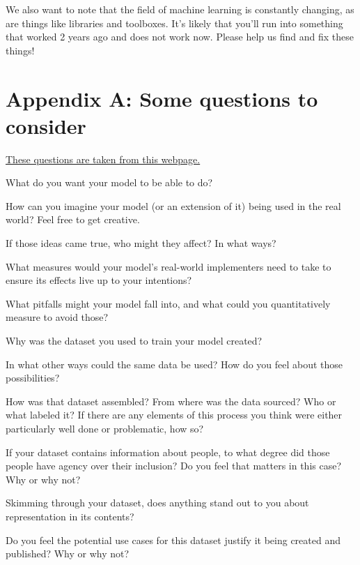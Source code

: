 \documentclass{tufte-handout}
\begin{document}
We also want to note that the field of machine learning is constantly changing, as are things like libraries and toolboxes. It's likely that you'll run into something that worked 2 years ago and does not work now. Please help us find and fix these things!



\section{Appendix A: Some questions to consider}
\href{https://www.notion.so/ANN-Project-Framing-76e1b6af347f475a983487996ac9760d}{These questions are taken from this webpage.}
\bi
\item What do you want your model to be able to do?
\item How can you imagine your model (or an extension of it) being used in the real world? Feel free to get creative.
\item If those ideas came true, who might they affect? In what ways?
\item What measures would your model's real-world implementers need to take to ensure its effects live up to your intentions?
\item What pitfalls might your model fall into, and what could you quantitatively measure to avoid those?
\item Why was the dataset you used to train your model created?
\item In what other ways could the same data be used? How do you feel about those possibilities?
\item How was that dataset assembled? From where was the data sourced? Who or what labeled it? If there are any elements of this process you think were either particularly well done or problematic, how so?
\item If your dataset contains information about people, to what degree did those people have agency over their inclusion? Do you feel that matters in this case? Why or why not?
\item Skimming through your dataset, does anything stand out to you about representation in its contents?
\item Do you feel the potential use cases for this dataset justify it being created and published? Why or why not?
\ei
\end{document}
